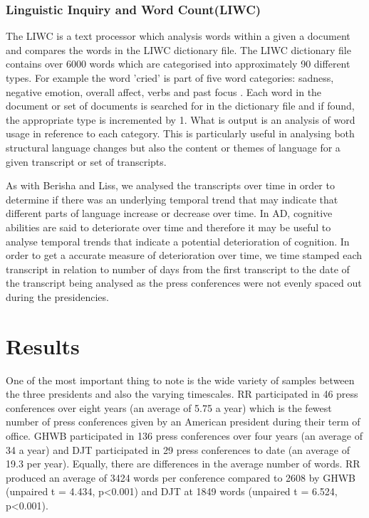 \documentclass[12pt]{article}
\begin{document}
\subsubsection{Linguistic Inquiry and Word Count(LIWC)}
The LIWC is a text processor which analysis words within a given a document and compares the words in the LIWC dictionary file. The LIWC dictionary file contains over 6000 words which are categorised into approximately 90 different types. For example the word 'cried' is part of five word categories: sadness, negative emotion, overall affect, verbs and past focus \cite{Pennebaker2015}. Each word in the document or set of documents is searched for in the dictionary file and if found, the appropriate type is incremented by 1. What is output is an analysis of word usage in reference to each category. This is particularly useful in analysing both structural language changes but also the content or themes of language for a given transcript or set of transcripts.
\par 
As with Berisha and Liss, we analysed the transcripts over time in order to determine if there was an underlying temporal trend that may indicate that different parts of language increase or decrease over time. In AD, cognitive abilities are said to deteriorate over time and therefore it may be useful to analyse temporal trends that indicate a potential deterioration of cognition. In order to get a accurate measure of deterioration over time, we time stamped each transcript in relation to number of days from the first transcript to the date of the transcript being analysed as the press conferences were not evenly spaced out during the presidencies.

\section{Results}\label{results}
One of the most important thing to note is the wide variety of samples between the three presidents and also the varying timescales. RR participated in 46 press conferences over eight years (an average of 5.75 a year) which is the fewest number of press conferences given by an American president during their term of office. GHWB participated in 136 press conferences over four years (an average of 34 a year) and DJT participated in 29 press conferences to date (an average of 19.3 per year). Equally, there are differences in the average number of words. RR produced an average of 3424 words per conference compared to 2608 by GHWB (unpaired t = 4.434, p\textless 0.001) and DJT at 1849 words (unpaired t = 6.524, p\textless 0.001).
\end{document}

